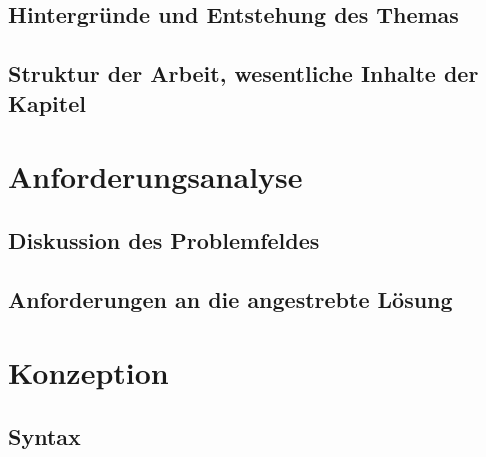   \subsection{Hintergründe und Entstehung des Themas}
  \label{ssec:Hintergründe und Entstehung des Themas}

  \subsection{Struktur der Arbeit, wesentliche Inhalte der Kapitel}
  \label{ssec:Struktur der Arbeit, wesentliche Inhalte der Kapitel}

\section{Anforderungsanalyse}
\label{sec:Anforderungsanalyse}
  \subsection{Diskussion des Problemfeldes}
  \label{ssec:Diskussion des Problemfeldes}

  \subsection{Anforderungen an die angestrebte Lösung}
  \label{ssec:Anforderungen an die angestrebte Lösung}

\section{Konzeption}
\label{sec:Konzeption}
  \subsection{Syntax}
  \label{ssec:Syntax}

